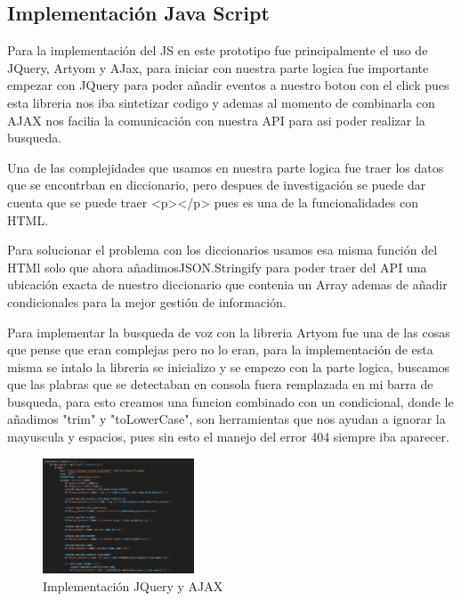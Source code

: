 \documentclass[conference]{IEEEtran}
\begin{document}
\subsection{Implementación Java Script}

Para la implementación del JS en este prototipo fue principalmente el uso de JQuery, Artyom y AJax, para iniciar con nuestra parte logica fue importante empezar con JQuery para poder añadir eventos a nuestro boton con el click pues esta libreria nos iba sintetizar codigo y ademas al momento de combinarla con AJAX nos facilia la comunicación con nuestra API para asi poder realizar la busqueda.

Una de las complejidades que usamos en nuestra parte logica fue traer los datos que se encontrban en diccionario, pero despues de investigación se puede dar cuenta que se puede traer <p></p> pues es una de la funcionalidades con HTML.

Para solucionar el problema con los diccionarios usamos esa misma función del HTMl solo que ahora añadimos{JSON.Stringify} para poder traer del API una ubicación exacta de nuestro diccionario que contenia un Array ademas de añadir condicionales para la mejor gestión de información.

Para implementar la busqueda de voz con la libreria Artyom fue una de las cosas que pense que eran complejas pero no lo eran, para la implementación de esta misma se intalo la libreria se inicializo y se empezo con la parte logica, buscamos que las plabras que se detectaban en consola fuera remplazada en mi barra de busqueda, para esto creamos una funcion combinado con un condicional, donde le añadimos "trim" y "toLowerCase", son herramientas que nos ayudan a ignorar la mayuscula y espacios, pues sin esto el manejo del error 404 siempre iba aparecer.

\begin{figure}[h] %
    \centering
    \includegraphics[width=0.4\textwidth]{images/JQuery.png} %
    \caption{Implementación JQuery y AJAX}
    \label{fig:mi_imagen}
\end{figure}
\end{document}
